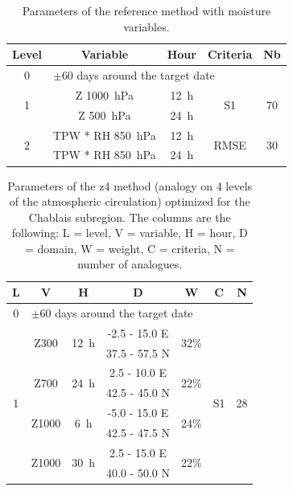 \documentclass[twocol]{ametsoc}
\begin{document}
\begin{table}[htbp]
	\footnotesize
	\caption{Parameters of the reference method with moisture variables.}
	\begin{center}
		\begin{tabular}{ccccc}
			\hline \textbf{Level} & \textbf{Variable} & \textbf{Hour} & \textbf{Criteria} & \textbf{Nb} \\ 
			\hline 
			0 & \multicolumn{4}{l}{$\pm 60$ days around the target date} \\
			\hline 
			\multirow{2}{*}{1} & Z 1000~hPa & 12~h & \multirow{2}{*}{S1} & \multirow{2}{*}{70} \\
			& Z 500~hPa & 24~h & & \\ 
			\hline
			\multirow{2}{*}{2} & TPW * RH 850~hPa & 12~h & \multirow{2}{*}{RMSE} & \multirow{2}{*}{30} \\
			& TPW * RH 850~hPa & 24~h & & \\ 
			\hline 
		\end{tabular} 
	\end{center}
	\label{table:params_R2}
\end{table}

\begin{table}[htbp]
	\footnotesize
	\caption{Parameters of the z4 method (analogy on 4 levels of the atmospheric circulation) optimized for the Chablais subregion. The columns are the following: L = level, V = variable, H = hour, D = domain, W = weight, C = criteria, N = number of analogues.}
	\begin{center}
		\begin{tabular}{ccccccc}
			\hline \textbf{L} & \textbf{V} & \textbf{H} & \textbf{D} & \textbf{W} & \textbf{C} & \textbf{N} \\ 
			\hline 
			0 & \multicolumn{6}{l}{$\pm 60$ days around the target date} \\
			\hline 
			\multirow{8}{*}{1} &  \multirow{2}{*}{Z300} & \multirow{2}{*}{12~h} & -2.5 - 15.0 \degree E & \multirow{2}{*}{32\%} & \multirow{8}{*}{S1} & \multirow{8}{*}{28} \\
			& & & 37.5 - 57.5 \degree N & & & \\ 
			& \multirow{2}{*}{Z700} & \multirow{2}{*}{24~h} & 2.5 - 10.0 \degree E & \multirow{2}{*}{22\%} & & \\ 
			& & & 42.5 - 45.0 \degree N & & & \\ 
			& \multirow{2}{*}{Z1000} & \multirow{2}{*}{6~h} & -5.0 - 15.0 \degree E & \multirow{2}{*}{24\%} & & \\ 
			& & & 42.5 - 47.5 \degree N & & & \\ 
			& \multirow{2}{*}{Z1000} & \multirow{2}{*}{30~h} & 2.5 - 15.0 \degree E & \multirow{2}{*}{22\%} & & \\ 
			& & & 40.0 - 50.0 \degree N & & & \\ 
			\hline 
		\end{tabular} 
	\end{center}
	\label{table:params_GA_z4}
\end{table}
\end{document}
